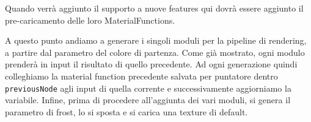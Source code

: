 \documentclass[main.tex]{subfiles}
\begin{document}
Quando verrà aggiunto il supporto a nuove features qui dovrà essere aggiunto il pre-caricamento delle loro MaterialFunctions.
\newline

A questo punto andiamo a generare i singoli moduli per la pipeline di rendering, a partire dal parametro del colore di partenza. Come già mostrato, ogni modulo prenderà in input il risultato di quello precedente. Ad ogni generazione quindi colleghiamo la material function precedente salvata per puntatore dentro \lstinline{previousNode} agli input di quella corrente e successivamente aggiorniamo la variabile. Infine, prima di procedere all'aggiunta dei vari moduli, si genera il parametro di frost, lo si sposta e si carica una texture di default. \newline
% 
%
%
\end{document}
